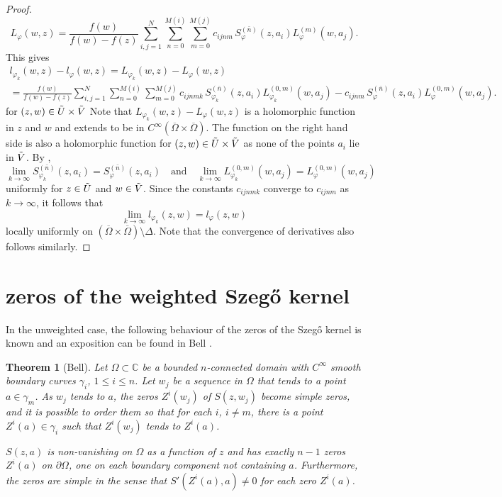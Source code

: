 \documentclass[11pt, reqno]{amsart}
\newtheorem{thm}{Theorem}[section]
\numberwithin{equation}{section}
\newcommand{\Om}{\Omega}
\begin{document}
\begin{proof}
\begin{equation}
L_{\varphi}(w,z) 
=
\frac{f(w)}{f(w)-f(z)} \sum_{i,j=1}^N \sum_{n=0}^{M(i)} \sum_{m=0}^{M(j)} c_{ijnm}\, S_{\varphi}^{(\bar{n})}(z,a_i)
L_{\varphi}^{(m)}(w,a_j).
\end{equation}
This gives 
\begin{multline*}
l_{\varphi_k}(w,z) - l_{\varphi}(w,z) 
=
L_{\varphi_k}(w,z) - L_{\varphi}(w,z) 
\\= \frac{f(w)}{f(w)-f(z)}
 \sum_{i,j=1}^N \sum_{n=0}^{M(i)} \sum_{m=0}^{M(j)} 
 c_{ijnmk}\, S_{\varphi_k}^{(\bar{n})}(z,a_i)
L_{\varphi_k}^{(0,m)}(w,a_j)
-
c_{ijnm}\, S_{\varphi}^{(\bar{n})}(z,a_i)
L_{\varphi}^{(0,m)}(w,a_j).
\end{multline*}
for $(z,w)\in \Tilde{U}\times\Tilde{V}$
Note that $L_{\varphi_k}(w,z) - L_{\varphi}(w,z)$ is a holomorphic function in $z$ and $w$ and extends to be in $C^{\infty}(\overline{\Omega}\times \overline{\Omega})$. The function on the right hand side is also a holomorphic function for $(z,w)\in\Tilde{U}\times\Tilde{V}$ as none of the points $a_i$ lie in $\Tilde{V}$. 
By \cite{JV}, 
\[
    \lim_{k\rightarrow\infty}S_{\varphi_k}^{(\bar{n})}(z,a_i)= S_{\varphi}^{(\bar{n})}(z,a_i)
	\quad
	\text{and}
	\quad
	\lim_{k\rightarrow\infty}L_{\varphi_k}^{(0,m)}(w,a_j)= L_{\varphi}^{(0,m)}(w,a_j)
\]
uniformly for $z \in \Tilde{U}$ and $w \in \Tilde{V}$. Since the constants $c_{ijnmk}$ converge to $c_{ijnm}$ as $k\rightarrow\infty$, it follows that 
\[
		\lim_{k\rightarrow\infty}l_{\varphi_k}(z,w) = l_{\varphi}(z,w)
		\]
		locally uniformly on $(\overline{\Om}\times\overline{\Om})\setminus\Delta$. Note that the convergence of derivatives also follows similarly. 
\end{proof}
	
	
	
		
	\section{zeros of the weighted Szeg\H{o} kernel}
	
\noindent In the unweighted case, the following behaviour of the zeros of the Szeg\H{o} kernel is known and an exposition can be found in Bell \cite{Be0}.
	
	\begin{thm}[Bell]
		Let $\Omega\subset\mathbb{C}$ be a bounded $n$-connected domain with $C^{\infty}$ smooth boundary curves $\gamma_i$, $1 \le i \le n$. Let $w_j$ be a sequence in $\Omega$ that tends to a point $a \in \gamma_m$. As $w_j$ tends to $a$, the zeros $Z^i(w_j)$ of $S(z,w_j)$ become simple zeros, and it is possible to order them so that for each $i$, $i\neq m$, there is a point $Z^i(a)\in\gamma_i$ such that $Z^i(w_j)$ tends to $Z^i(a)$. 
		
		\medskip
		
		$S(z,a)$ is non-vanishing on $\Om$ as a function of $z$ and has exactly $n-1$ zeros $Z^i(a)$ on $\partial\Om$, one on each boundary component not containing $a$. Furthermore, the zeros are simple in the sense that $S'(Z^i(a),a)\neq 0$ for each zero $Z^i(a)$. 
	\end{thm}
	
\end{document}
